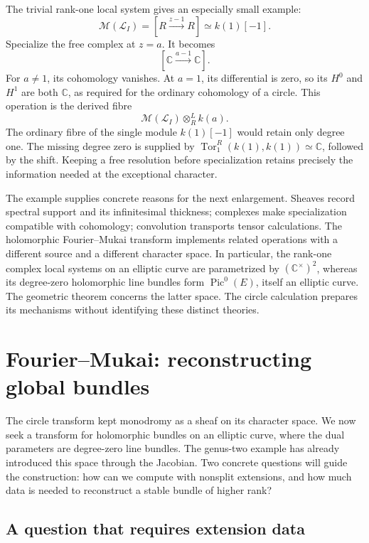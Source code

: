 \documentclass[11pt]{article}
\theoremstyle{remark}
\newcommand{\C}{\mathbb C}
\begin{document}
The trivial rank-one local system gives an especially small example:
\begin{equation}
\mathcal M(\mathcal L_I)
=[R\xrightarrow{z-1}R]\simeq k(1)[-1].
\label{circle:trivial}
\end{equation}
Specialize the free complex at \(z=a\). It becomes
\[
[\C\xrightarrow{a-1}\C].
\]
For \(a\ne1\), its cohomology vanishes. At \(a=1\), its differential is zero, so its \(H^0\) and \(H^1\) are both \(\C\), as required for the ordinary cohomology of a circle. This operation is the derived fibre
\[
\mathcal M(\mathcal L_I)\otimes_R^L k(a).
\]
The ordinary fibre of the single module \(k(1)[-1]\) would retain only degree one. The missing degree zero is supplied by
\(\operatorname{Tor}_1^R(k(1),k(1))\simeq\C\), followed by the shift. Keeping a free resolution before specialization retains precisely the information needed at the exceptional character.

The example supplies concrete reasons for the next enlargement. Sheaves record spectral support and its infinitesimal thickness; complexes make specialization compatible with cohomology; convolution transports tensor calculations. The holomorphic Fourier--Mukai transform implements related operations with a different source and a different character space. In particular, the rank-one complex local systems on an elliptic curve are parametrized by \((\C^\times)^2\), whereas its degree-zero holomorphic line bundles form \(\operatorname{Pic}^0(E)\), itself an elliptic curve. The geometric theorem concerns the latter space. The circle calculation prepares its mechanisms without identifying these distinct theories.

\section{Fourier--Mukai: reconstructing global bundles}
\label{categorical:section}

The circle transform kept monodromy as a sheaf on its character space. We now seek a transform for holomorphic bundles on an elliptic curve, where the dual parameters are degree-zero line bundles. The genus-two example has already introduced this space through the Jacobian. Two concrete questions will guide the construction: how can we compute with nonsplit extensions, and how much data is needed to reconstruct a stable bundle of higher rank?


\subsection{A question that requires extension data}
\end{document}
